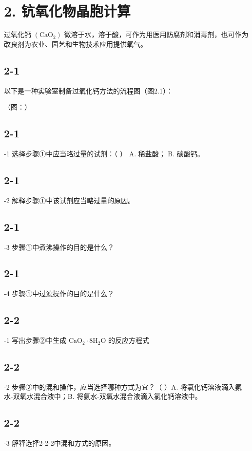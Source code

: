 \section*{2. 钪氧化物晶胞计算}
过氧化钙 $\left( \mathrm { C a O _ { 2 } } \right)$ 微溶于⽔，溶于酸，可作为⽤医⽤防腐剂和消毒剂，也可作为改良剂为农业、园艺和⽣物技术应⽤提供氧⽓。

\subsection*{2-1}
以下是⼀种实验室制备过氧化钙⽅法的流程图（图2.1）：

（图：）

\subsection*{2-1}
-1 选择步骤①中应当略过量的试剂：（ ） A. 稀盐酸； B. 碳酸钙。

\subsection*{2-1}
-2 解释步骤①中该试剂应当略过量的原因。

\subsection*{2-1}
-3 步骤①中煮沸操作的⽬的是什么？

\subsection*{2-1}
-4 步骤①中过滤操作的⽬的是什么？

\subsection*{2-2}
-1 写出步骤②中⽣成 $\mathrm { C a O } _ { 2 } { \cdot } 8 \mathrm { H } _ { 2 } \mathrm { O }$ 的反应⽅程式

\subsection*{2-2}
-2 步骤②中的混和操作，应当选择哪种⽅式为宜？（ ）A. 将氯化钙溶液滴⼊氨⽔-双氧⽔混合液中；B. 将氨⽔-双氧⽔混合液滴⼊氯化钙溶液中。

\subsection*{2-2}
-3 解释选择2-2-2中混和⽅式的原因。

